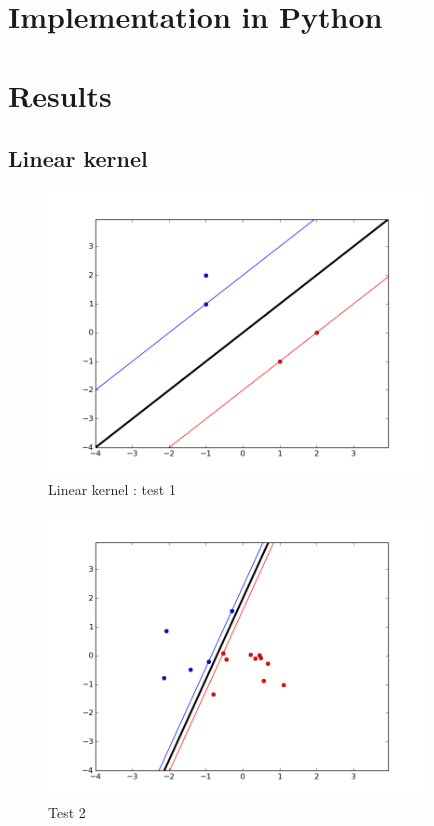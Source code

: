\documentclass{article}
\begin{document}
\section{Implementation in Python}



\section{Results}
\newpage
\subsection{Linear kernel}
\begin{figure}[!h]
	\begin{center}
		\includegraphics[width=10cm]{images/linear/figure_1.png}
		\caption{Linear kernel : test 1}
		\label{linear_figure_1}
	\end{center}
\end{figure}

\begin{figure}[!h]
	\begin{center}
		\includegraphics[width=10cm]{images/linear/figure_2.png}
		\caption{Test 2}
		\label{Linear kernel : test 2}
	\end{center}
\end{figure}
\end{document}
